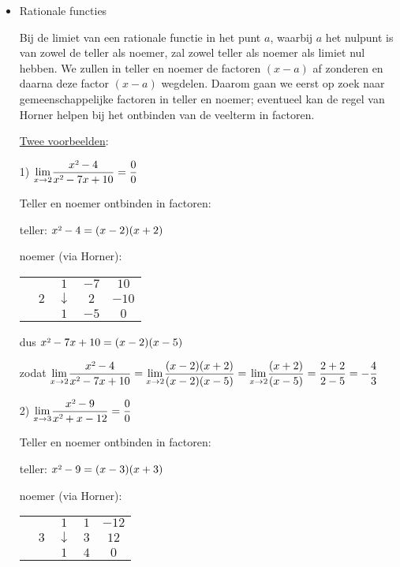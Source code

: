 \begin{itemize}
\item{Rationale functies}

Bij de limiet van een rationale functie in het punt $a$, waarbij
$a$ het nulpunt is van zowel de teller als noemer, zal zowel teller
als noemer als limiet nul hebben. We zullen in teller en noemer de
factoren $(x-a)$ af zonderen en daarna deze factor $(x-a)$ wegdelen.
Daarom gaan we eerst op zoek naar gemeenschappelijke factoren in teller
en noemer; eventueel kan de regel van Horner helpen bij het ontbinden
van de veelterm in factoren.

\medskip{}


\noindent \uline{Twee voorbeelden}:

\medskip{}


1) ${\displaystyle {\displaystyle \lim_{x\to2}}\frac{x\text{\texttwosuperior}-4}{x\text{\texttwosuperior}-7x+10}=\frac{0}{0}}$

Teller en noemer ontbinden in factoren:

teller: $x\text{\texttwosuperior}-4=(x-2)(x+2)$

noemer (via Horner): %
\begin{tabular}{cc|ccc}
	&  & $1$ & $-7$ & $10$\\
	& $2$ & $\downarrow$ & $2$ & $-10$\\
	\cline{2-5} 
	&  & $1$ & \multicolumn{1}{c||}{$-5$} & $0$\\
\end{tabular}

dus $x\text{\texttwosuperior}-7x+10=(x-2)(x-5)$

zodat ${\displaystyle {\displaystyle \lim_{x\to2}}\frac{x\text{\texttwosuperior}-4}{x\text{\texttwosuperior}-7x+10}={\displaystyle \lim_{x\to2}}\frac{(x-2)(x+2)}{(x-2)(x-5)}={\displaystyle \lim_{x\to2}}\frac{(x+2)}{(x-5)}=\frac{2+2}{2-5}=-\frac{4}{3}}$\bigskip{}


2) ${\displaystyle {\displaystyle \lim_{x\to3}}\frac{x\text{\texttwosuperior}-9}{x\text{\texttwosuperior}+x-12}=\frac{0}{0}}$

Teller en noemer ontbinden in factoren:

teller: $x\text{\texttwosuperior}-9=(x-3)(x+3)$

noemer (via Horner): %
\begin{tabular}{cc|ccc}
	&  & $1$ & $1$ & $-12$\\
	& $3$ & $\downarrow$ & $3$ & $12$\\
	\cline{2-5} 
	&  & $1$ & \multicolumn{1}{c||}{$4$} & $0$\\
\end{tabular}


\end{itemize}

